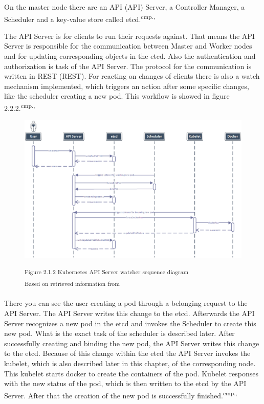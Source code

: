 On the master node there are an \acs{API} (\acl{API}) Server, a Controller Manager, a Scheduler and a key-value store called etcd.\textsuperscript{cmp.\cite{19}, \cite{22}}

The API Server is for clients to run their requests against. That means the API Server is responsible for the communication between Master and Worker nodes and for updating corresponding objects in the etcd. Also the authentication and authorization is task of the API Server. The protocol for the communication is written in \acs{REST} (\acl{REST}). For reacting on changes of clients there is also a watch mechanism implemented, which triggers an action after some specific changes, like the scheduler creating a new pod. This workflow is showed in figure 2.2.2.\textsuperscript{cmp.\cite{19}, \cite{22}}

\begin{figure}[h]
\centering
\includegraphics[width=\textwidth]{images/kubernetes_watcher_sequence.png}

\textsuperscript{Figure 2.1.2 Kubernetes API Server watcher sequence diagram}\\
\textsuperscript{Based on retrieved information from \cite{22}}
\end{figure}

There you can see the user creating a pod through a belonging request to the API Server. The API Server writes this change to the etcd. Afterwards the API Server recognizes a new pod in the etcd and invokes the Scheduler to create this new pod. What is the exact task of the scheduler is described later. After successfully creating and binding the new pod, the API Server writes this change to the etcd. Because of this change within the etcd the API Server invokes the kubelet, which is also described later in this chapter, of the corresponding node. This kubelet starts docker to create the containers of the pod. Kubelet responses with the new status of the pod, which is then written to the etcd by the API Server. After that the creation of the new pod is successfully finished.\textsuperscript{cmp.\cite{19}, \cite{22}}

